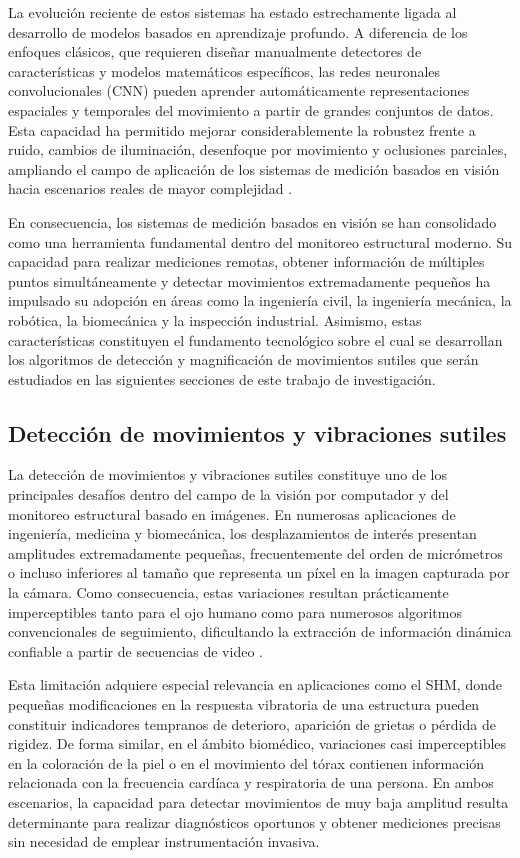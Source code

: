 La evolución reciente de estos sistemas ha estado estrechamente ligada al desarrollo de modelos basados en aprendizaje profundo. A diferencia de los enfoques clásicos, que requieren diseñar manualmente detectores de características y modelos matemáticos específicos, las redes neuronales convolucionales (\gls{CNN}) pueden aprender automáticamente representaciones espaciales y temporales del movimiento a partir de grandes conjuntos de datos. Esta capacidad ha permitido mejorar considerablemente la robustez frente a ruido, cambios de iluminación, desenfoque por movimiento y oclusiones parciales, ampliando el campo de aplicación de los sistemas de medición basados en visión hacia escenarios reales de mayor complejidad \cite{sun2018pwc,cheng2025vision}.

En consecuencia, los sistemas de medición basados en visión se han consolidado como una herramienta fundamental dentro del monitoreo estructural moderno. Su capacidad para realizar mediciones remotas, obtener información de múltiples puntos simultáneamente y detectar movimientos extremadamente pequeños ha impulsado su adopción en áreas como la ingeniería civil, la ingeniería mecánica, la robótica, la biomecánica y la inspección industrial. Asimismo, estas características constituyen el fundamento tecnológico sobre el cual se desarrollan los algoritmos de detección y magnificación de movimientos sutiles que serán estudiados en las siguientes secciones de este trabajo de investigación.

    \subsection{Detección de movimientos y vibraciones sutiles}
La detección de movimientos y vibraciones sutiles constituye uno de los principales desafíos dentro del campo de la visión por computador y del monitoreo estructural basado en imágenes. En numerosas aplicaciones de ingeniería, medicina y biomecánica, los desplazamientos de interés presentan amplitudes extremadamente pequeñas, frecuentemente del orden de micrómetros o incluso inferiores al tamaño que representa un píxel en la imagen capturada por la cámara. Como consecuencia, estas variaciones resultan prácticamente imperceptibles tanto para el ojo humano como para numerosos algoritmos convencionales de seguimiento, dificultando la extracción de información dinámica confiable a partir de secuencias de video \cite{cheng2025vision}.

Esta limitación adquiere especial relevancia en aplicaciones como el \gls{SHM}, donde pequeñas modificaciones en la respuesta vibratoria de una estructura pueden constituir indicadores tempranos de deterioro, aparición de grietas o pérdida de rigidez. De forma similar, en el ámbito biomédico, variaciones casi imperceptibles en la coloración de la piel o en el movimiento del tórax contienen información relacionada con la frecuencia cardíaca y respiratoria de una persona. En ambos escenarios, la capacidad para detectar movimientos de muy baja amplitud resulta determinante para realizar diagnósticos oportunos y obtener mediciones precisas sin necesidad de emplear instrumentación invasiva.

